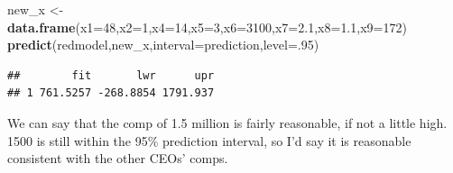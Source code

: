 \documentclass[
]{article}
\newenvironment{Shaded}{\begin{snugshade}}{\end{snugshade}}
\newcommand{\AttributeTok}[1]{\textcolor[rgb]{0.13,0.29,0.53}{#1}}
\newcommand{\DecValTok}[1]{\textcolor[rgb]{0.00,0.00,0.81}{#1}}
\newcommand{\FloatTok}[1]{\textcolor[rgb]{0.00,0.00,0.81}{#1}}
\newcommand{\FunctionTok}[1]{\textcolor[rgb]{0.13,0.29,0.53}{\textbf{#1}}}
\newcommand{\NormalTok}[1]{#1}
\newcommand{\OtherTok}[1]{\textcolor[rgb]{0.56,0.35,0.01}{#1}}
\newcommand{\StringTok}[1]{\textcolor[rgb]{0.31,0.60,0.02}{#1}}
\begin{document}
\begin{Shaded}
\begin{Highlighting}[]
\NormalTok{new\_x }\OtherTok{\textless{}{-}} \FunctionTok{data.frame}\NormalTok{(}\AttributeTok{x1=}\DecValTok{48}\NormalTok{,}\AttributeTok{x2=}\DecValTok{1}\NormalTok{,}\AttributeTok{x4=}\DecValTok{14}\NormalTok{,}\AttributeTok{x5=}\DecValTok{3}\NormalTok{,}\AttributeTok{x6=}\DecValTok{3100}\NormalTok{,}\AttributeTok{x7=}\FloatTok{2.1}\NormalTok{,}\AttributeTok{x8=}\FloatTok{1.1}\NormalTok{,}\AttributeTok{x9=}\DecValTok{172}\NormalTok{)}
\FunctionTok{predict}\NormalTok{(redmodel,new\_x,}\AttributeTok{interval=}\StringTok{\textquotesingle{}prediction\textquotesingle{}}\NormalTok{,}\AttributeTok{level=}\NormalTok{.}\DecValTok{95}\NormalTok{)}
\end{Highlighting}
\end{Shaded}

\begin{verbatim}
##        fit       lwr      upr
## 1 761.5257 -268.8854 1791.937
\end{verbatim}

We can say that the comp of 1.5 million is fairly reasonable, if not a
little high. 1500 is still within the 95\% prediction interval, so I'd
say it is reasonable consistent with the other CEOs' comps.
\end{document}
